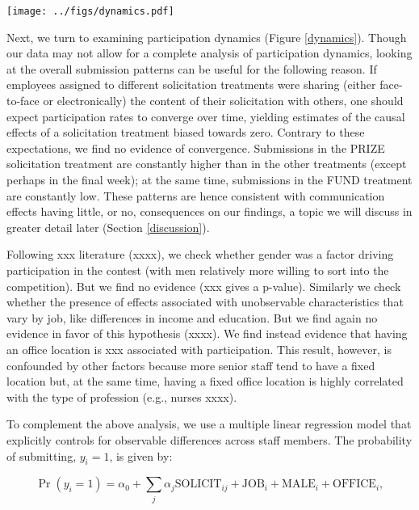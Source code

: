 \documentclass[12pt, titlepage]{article}
\begin{document}
\texttt{[image: ../figs/dynamics.pdf]}

Next, we turn to examining participation dynamics (Figure
\ref{dynamics}). Though our data may not allow for a complete analysis
of participation dynamics, looking at the overall submission patterns
can be useful for the following reason. If employees assigned to
different solicitation treatments were sharing (either face-to-face or
electronically) the content of their solicitation with others, one
should expect participation rates to converge over time, yielding
estimates of the causal effects of a solicitation treatment biased
towards zero. Contrary to these expectations, we find no evidence of
convergence. Submissions in the PRIZE solicitation treatment are
constantly higher than in the other treatments (except perhaps in the
final week); at the same time, submissions in the FUND treatment are
constantly low. These patterns are hence consistent with communication
effects having little, or no, consequences on our findings, a topic we
will discuss in greater detail later (Section \ref{discussion}).

Following xxx literature (xxxx), we check whether gender was a factor
driving participation in the contest (with men relatively more willing
to sort into the competition). But we find no evidence (xxx gives a
p-value). Similarly we check whether the presence of effects associated
with unobservable characteristics that vary by job, like differences in
income and education. But we find again no evidence in favor of this
hypothesis (xxxx). We find instead evidence that having an office
location is xxx associated with participation. This result, however, is
confounded by other factors because more senior staff tend to have a
fixed location but, at the same time, having a fixed office location is
highly correlated with the type of profession (e.g., nurses xxxx).

To complement the above analysis, we use a multiple linear regression
model that explicitly controls for observable differences across staff
members. The probability of submitting, \(y_i=1\), is given by:

\[\Pr(y_i=1) = \alpha_0 
                                    + \sum_{j} \alpha_{j} \text{SOLICIT}_{ij}
                                    + \text{JOB}_{i} 
                                    + \text{MALE}_{i} 
                                    + \text{OFFICE}_{i},\label{submit}\]
\end{document}

